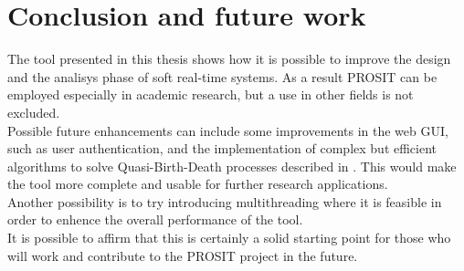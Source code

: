 \chapter{Conclusion and future work}\label{chp:conclusion}


The tool presented in this thesis shows how it is possible to improve the design and the analisys phase of soft real-time systems. As a result PROSIT can be employed especially in academic research, but a use in other fields is not excluded.\\
Possible future enhancements can include some improvements in the web GUI, such as user authentication, and the implementation of complex but efficient algorithms to solve Quasi-Birth-Death processes described in \cite{futurework}. This would make the tool more complete and usable for further research applications.\\
Another possibility is to try introducing multithreading where it is feasible in order to enhence the overall performance of the tool.\\
It is possible to affirm that this is certainly a solid starting point for those who will work and contribute to the PROSIT project in the future.      

%
%